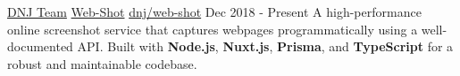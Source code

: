 
\begin{cventries}
	\cventry
		{\href{https://dnj.co.ir}{DNJ Team}} %
		{\href{https://web-shot.ir}{\acvHeaderIconSep Web-Shot}} %
		{\href{https://github.com/dnj/web-shot}{\faGithubSquare\acvHeaderIconSep dnj/web-shot}} %
		{Dec 2018 - Present} %
		{A high-performance online screenshot service that captures webpages programmatically using a well-documented API. Built with \textbf{Node.js}, \textbf{Nuxt.js}, \textbf{Prisma}, and \textbf{TypeScript} for a robust and maintainable codebase.}

\end{cventries}
